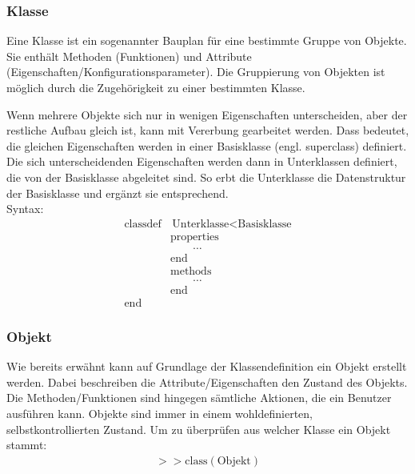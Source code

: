 \documentclass[12pt,bibstyle=none,pagenumberinfooter]{ifmdocument}
\begin{document}
	\subsubsection{Klasse}
	Eine Klasse ist ein sogenannter Bauplan f\"ur eine bestimmte Gruppe von Objekte. Sie enth\"alt Methoden (Funktionen) und Attribute (Eigenschaften/Konfigurationsparameter). 
	Die Gruppierung von Objekten ist m\"oglich durch die Zugeh\"origkeit zu einer bestimmten Klasse. 
	
	Wenn mehrere Objekte sich nur in wenigen Eigenschaften unterscheiden, aber der restliche Aufbau gleich ist, kann mit Vererbung gearbeitet werden. Dass bedeutet, die gleichen Eigenschaften werden in einer Basisklasse (engl. superclass) definiert. Die sich unterscheidenden Eigenschaften werden dann in Unterklassen definiert, die von der Basisklasse abgeleitet sind. So erbt die Unterklasse die Datenstruktur der Basisklasse und erg\"anzt sie entsprechend.\\
	Syntax: 
	\begin{align*}
		\text{classdef}& \,\text{Unterklasse} < \text{Basisklasse}  \\
		&\text{properties}\\
		& \qquad \ldots \\
		&\text{end}\\
		&\text{methods}\\
		&\qquad	\ldots \\
		&\text{end}\\
		\text{end} \quad &
	\end{align*}	
	\subsubsection{Objekt}
	Wie bereits erw\"ahnt kann auf Grundlage der Klassendefinition ein Objekt erstellt werden. Dabei beschreiben die Attribute/Eigenschaften den Zustand des Objekts. Die Methoden/Funktionen sind hingegen s\"amtliche Aktionen, die ein Benutzer ausf\"uhren kann. Objekte sind immer in einem wohldefinierten, selbstkontrollierten Zustand. 
	Um zu überprüfen aus welcher Klasse ein Objekt stammt:
	\begin{gather*}
	>> \text{class}(\text{Objekt})
	\end{gather*}
\end{document}
